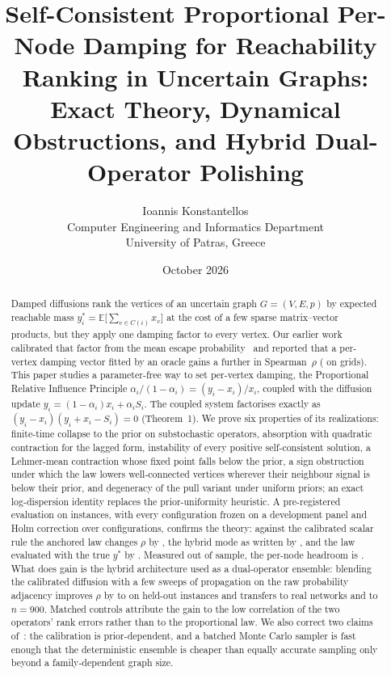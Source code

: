 \documentclass[11pt,a4paper]{article}
\title{\textbf{Self-Consistent Proportional Per-Node Damping for Reachability Ranking in Uncertain Graphs: Exact Theory, Dynamical Obstructions, and Hybrid Dual-Operator Polishing}}
\author{Ioannis Konstantellos\\[2pt]
\small Computer Engineering and Informatics Department\\
\small University of Patras, Greece}
\date{October 2026}
\theoremstyle{definition}
\theoremstyle{plain}
\newcommand{\E}{\mathbb{E}}
\begin{document}
\maketitle

\begin{abstract}
\noindent Damped diffusions rank the vertices of an uncertain graph $G=(V,E,p)$ by expected reachable mass $y^*_i=\E\big[\sum_{v\in C(i)}x_v\big]$ at the cost of a few sparse matrix--vector products, but they apply one damping factor to every vertex. Our earlier work calibrated that factor from the mean escape probability~\cite{konstantellos26} and reported that a per-vertex damping vector fitted by an oracle gains a further \PrevHeadAll{} in Spearman~$\rho$ (\PrevHeadGrid{} on grids). This paper studies a parameter-free way to set per-vertex damping, the Proportional Relative Influence Principle $\alpha_i/(1-\alpha_i)=(y_i-x_i)/x_i$, coupled with the diffusion update $y_i=(1-\alpha_i)x_i+\alpha_iS_i$. The coupled system factorises exactly as $(y_i-x_i)(y_i+x_i-S_i)=0$ (Theorem~1). We prove six properties of its realizations: finite-time collapse to the prior on substochastic operators, absorption with quadratic contraction for the lagged form, instability of every positive self-consistent solution, a Lehmer-mean contraction whose fixed point falls below the prior, a sign obstruction under which the law lowers well-connected vertices wherever their neighbour signal is below their prior, and degeneracy of the pull variant under uniform priors; an exact log-dispersion identity replaces the prior-uniformity heuristic. A pre-registered evaluation on \NTotal{} instances, with every configuration frozen on a development panel and Holm correction over \NFrozen{} configurations, confirms the theory: against the calibrated scalar rule the anchored law changes $\rho$ by \TestAPoneD, the hybrid mode as written by \TestPBXnomBD, and the law evaluated with the true $y^*$ by \TestTruePropD. Measured out of sample, the per-node headroom is \HeadAll. What does gain is the hybrid architecture used as a dual-operator ensemble: blending the calibrated diffusion with a few sweeps of propagation on the raw probability adjacency improves $\rho$ by \TestPBXbestD{} to \TestLinNineD{} on held-out instances and transfers to real networks and to $n=900$. Matched controls attribute the gain to the low correlation of the two operators' rank errors rather than to the proportional law. We also correct two claims of~\cite{konstantellos26}: the calibration is prior-dependent, and a batched Monte Carlo sampler is fast enough that the deterministic ensemble is cheaper than equally accurate sampling only beyond a family-dependent graph size.
\end{abstract}
\end{document}

